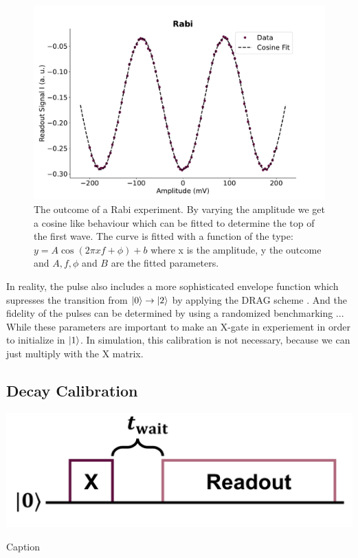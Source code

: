 \begin{figure}
    \centering
    \includegraphics{Calibrations/Figures/Rabi.pdf}
    \caption{The outcome of a Rabi experiment. By varying the amplitude we get a cosine like behaviour which can be fitted to determine the top of the first wave. The curve is fitted with a function of the type: $y = A \cos(2 \pi x f + \phi) + b$ where x is the amplitude, y the outcome and $A, f, \phi$ and $B$ are the fitted parameters.}
    \label{fig:calibration_rabi}
\end{figure}
\noindent
In reality, the pulse also includes a more sophisticated envelope function which supresses the transition from $\ket{0}\to\ket{2}$ by applying the DRAG scheme \cite{motzoi_simple_2009}. And the fidelity of the pulses can be determined by using a randomized benchmarking ...  While these parameters are important to make an X-gate in experiement in order to initialize in $\ket{1}$. In simulation, this calibration is not necessary, because we can just multiply with the X matrix.


\subsection{Decay Calibration}\label{sec:calibration_t1}
\begin{marginfigure}
    \centering
    \includegraphics[]{Figs/circuits/t1.png}
    \caption{Caption}
    \label{fig:enter-label}
\end{marginfigure}

